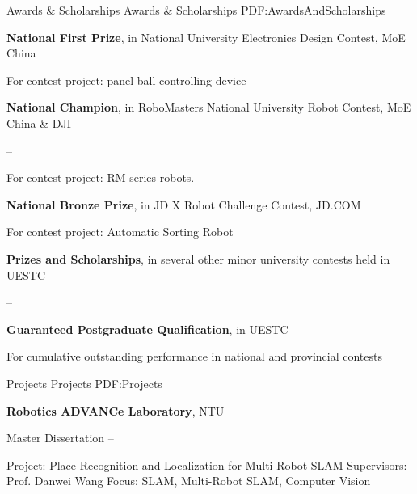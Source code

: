 \documentclass[letterpaper,MMMyyyy,nonstopmode]{simpleresumecv}
\begin{document}
\begin{Body}

\Section
{Awards \&\newline
	Scholarships}
{Awards \& Scholarships}
{PDF:AwardsAndScholarships}

\BulletItem
\textbf{National First Prize},
in National  University Electronics Design Contest, 
MoE China
\hfill
{}
\begin{Detail}
	\Item
	For contest project: panel-ball controlling device
\end{Detail}

\Gap
\BulletItem
\textbf{National Champion},
in RoboMasters National University Robot Contest,
MoE China \& DJI

\hfill
{} --
\begin{Detail}
	\Item
	For contest project: RM series robots.
\end{Detail}

\Gap
\BulletItem
\textbf{National Bronze Prize},
in JD X Robot Challenge Contest,
JD.COM
\hfill
{}
\begin{Detail}
	\Item
	For contest project: Automatic Sorting Robot
\end{Detail}

\Gap
\BulletItem
\textbf{Prizes and Scholarships}, 
in several other minor university contests held in UESTC

\hfill
{} --

\Gap
\BulletItem
\textbf{Guaranteed Postgraduate Qualification},
in UESTC
\hfill
{}
\begin{Detail}
	\Item
	For cumulative outstanding performance in national and provincial contests
\end{Detail}


\Section
{Projects}
{Projects}
{PDF:Projects}

\Entry
{\textbf{Robotics ADVANCe Laboratory}},
NTU

\BulletItem
Master Dissertation
\hfill
{} --
\begin{Detail}
\SubBulletItem
Project:
Place Recognition and Localization for Multi-Robot SLAM
\SubBulletItem
Supervisors:
Prof. Danwei Wang
\SubBulletItem
Focus:
SLAM, Multi-Robot SLAM, Computer Vision
\end{Detail}


\end{Body}
\end{document}
